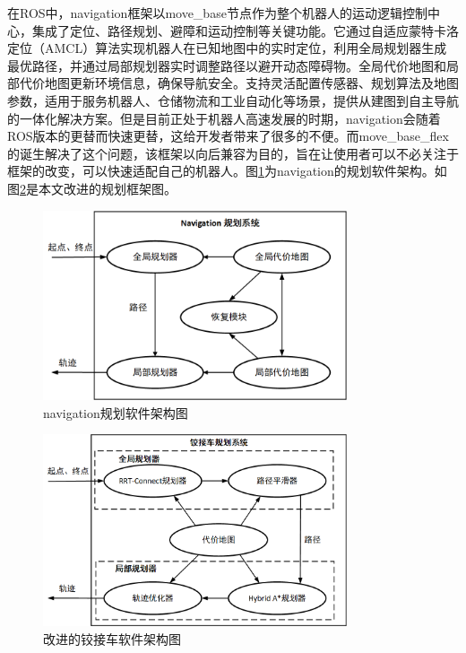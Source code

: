 \documentclass[master,academic]{ysuthesis} %
\begin{document}
	在ROS中，navigation框架以move\_base节点作为整个机器人的运动逻辑控制中心，集成了定位、路径规划、避障和运动控制等关键功能。它通过自适应蒙特卡洛定位（​AMCL）算法实现机器人在已知地图中的实时定位，利用全局规划器生成最优路径，并通过局部规划器实时调整路径以避开动态障碍物。全局代价地图和局部代价地图更新环境信息，确保导航安全。支持灵活配置传感器、规划算法及地图参数，适用于服务机器人、仓储物流和工业自动化等场景，提供从建图到自主导航的一体化解决方案。但是目前正处于机器人高速发展的时期，navigation会随着ROS版本的更替而快速更替，这给开发者带来了很多的不便。而move\_base\_flex的诞生解决了这个问题，该框架以向后兼容为目的，旨在让使用者可以不必关注于框架的改变，可以快速适配自己的机器人。图\ref{fig:navigation规划框架图}为navigation的规划软件架构。如图\ref{fig:改进的规划框架图}是本文改进的规划框架图。
	\begin{figure}[H]
		\centering
		\includegraphics[width=0.8\textwidth]{navigation规划框架.png}
		\caption{navigation规划软件架构图}
		\label{fig:navigation规划框架图}
	\end{figure}
	\begin{figure}[H]
		\centering
		\includegraphics[width=0.8\textwidth]{我的规划框架.png}
		\caption{改进的铰接车软件架构图}
		\label{fig:改进的规划框架图}
	\end{figure}
	
\end{document}
